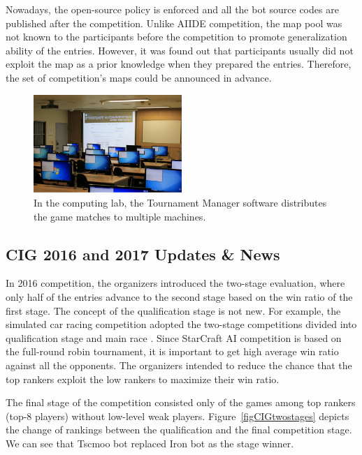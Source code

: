 Nowadays, the open-source policy is enforced and all the bot source codes are published after the competition. Unlike AIIDE competition, the map pool was not known to the participants before the competition to promote generalization ability of the entries. However, it was found out that participants usually did not exploit the map as a prior knowledge when they prepared the entries. Therefore, the set of competition's maps could be announced in advance. 

\begin{figure}[h]
  \centering
  \includegraphics[width=0.5\textwidth]{fig/cig-starcraft-runs.png}
  \caption{In the computing lab, the Tournament Manager software distributes the game matches to multiple machines.}
  \label{figCIGruns}
\end{figure}

\subsection*{CIG 2016 and 2017 Updates \& News}\label{subsecCIGnews}

In 2016 competition, the organizers introduced the two-stage evaluation, where only half of the entries advance to the second stage based on the win ratio of the first stage. The concept of the qualification stage is not new. For example, the simulated car racing competition adopted the two-stage competitions divided into qualification stage and main race \cite{loiacono20102009}. Since StarCraft AI competition is based on the full-round robin tournament, it is important to get high average win ratio against all the opponents. The organizers intended to reduce the chance that the top rankers exploit the low rankers to maximize their win ratio. 

The final stage of the competition consisted only of the games among top rankers (top-8 players) without low-level weak players. Figure~\ref{figCIGtwostages} depicts the change of rankings between the qualification and the final competition stage. We can see that Tscmoo bot replaced Iron bot as the stage winner. 

